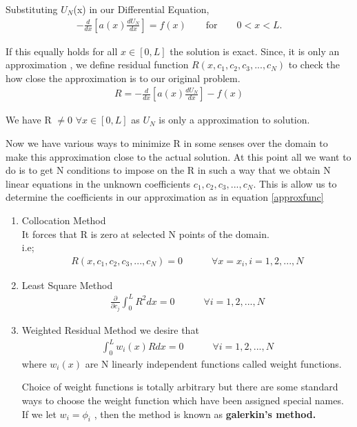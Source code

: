 
 Substituting  $U_N$(x) in our Differential Equation, 
 \begin{eqnarray}
 	-\frac{d}{dx} \left[a(x)\frac{dU_N}{dx} \right] = f(x)  \quad\quad  \text{for} \quad\quad  0<x<L.
 \end{eqnarray}

If this equally holds for all $x \in [0,L] $ the solution is exact. Since, it is only an approximation , we define residual function $R(x,c_1, c_2, c_3,...,c_N)$ to check the how close the approximation is to our original problem.
\begin{eqnarray}
	R = -\frac{d}{dx} \left[a(x)\frac{dU_N}{dx} \right] - f(x)
\end{eqnarray} 

We have R $\neq$0 $ \forall x  \in [0, L]$  as $U_N$ is only a approximation to solution.
\pagebreak

Now we have various ways to minimize R in some senses over the domain to make this approximation close to the actual solution. At this point all we want to do is to get N conditions to impose on the R in such a way that we obtain N linear equations in the unknown coefficients $c_1, c_2, c_3,...,c_N$.
This is allow us to determine the coefficients in our approximation as in equation \ref{approxfunc}
\begin{enumerate}
	\item Collocation Method\\
	It forces that R is zero at selected N points of the domain.\\
	i.e; 
	\begin{eqnarray}
		R(x,c_1, c_2, c_3,...,c_N) = 0  \quad\quad\quad \forall x=x_i, i = 1,2,...,N
	\end{eqnarray}

	\item Least Square Method
		\begin{eqnarray}
			\frac{\partial}{\partial c_j} \int_{0}^{L} R^2 dx = 0 \quad\quad\quad \forall i = 1,2,...,N
		\end{eqnarray}
	
	\item Weighted Residual Method
		we desire that 
			\begin{eqnarray}\label{weightedintegralgen}
				\int_{0}^{L} w_i(x) R dx = 0 \quad\quad\quad \forall i = 1,2,...,N
			\end{eqnarray}
		where $w_i(x)$ are N linearly independent functions called weight functions.
		
		Choice of weight functions is totally arbitrary but there are some standard ways to choose the weight function which have been assigned special names. If we let $w_i = \phi_i$ , then the method is known as \textbf{galerkin's method.}
\end{enumerate}

